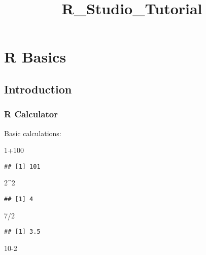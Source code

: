 \documentclass[
]{article}
\title{R\_Studio\_Tutorial}
\author{}
\date{\vspace{-2.5em}}
\newenvironment{Shaded}{\begin{snugshade}}{\end{snugshade}}
\newcommand{\DecValTok}[1]{\textcolor[rgb]{0.00,0.00,0.81}{#1}}
\newcommand{\SpecialCharTok}[1]{\textcolor[rgb]{0.00,0.00,0.00}{#1}}
\begin{document}
\maketitle

\hypertarget{r-basics}{%
\section{R Basics}\label{r-basics}}

\hypertarget{introduction}{%
\subsection{Introduction}\label{introduction}}

\hypertarget{r-calculator}{%
\subsubsection{R Calculator}\label{r-calculator}}

Basic calculations:

\begin{Shaded}
\begin{Highlighting}[]
\DecValTok{1}\SpecialCharTok{+}\DecValTok{100}
\end{Highlighting}
\end{Shaded}

\begin{verbatim}
## [1] 101
\end{verbatim}

\begin{Shaded}
\begin{Highlighting}[]
\DecValTok{2}\SpecialCharTok{\^{}}\DecValTok{2}
\end{Highlighting}
\end{Shaded}

\begin{verbatim}
## [1] 4
\end{verbatim}

\begin{Shaded}
\begin{Highlighting}[]
\DecValTok{7}\SpecialCharTok{/}\DecValTok{2}
\end{Highlighting}
\end{Shaded}

\begin{verbatim}
## [1] 3.5
\end{verbatim}

\begin{Shaded}
\begin{Highlighting}[]
\DecValTok{10{-}2}
\end{Highlighting}
\end{Shaded}
\end{document}
